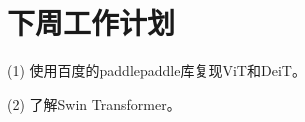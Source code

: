 \documentclass[letterpaper,10pt]{article}
\begin{document}
	
	\section{下周工作计划}
	
	(1) 使用百度的paddlepaddle库复现ViT和DeiT。
	
	(2) 了解Swin Transformer。
	
	
\end{document}
